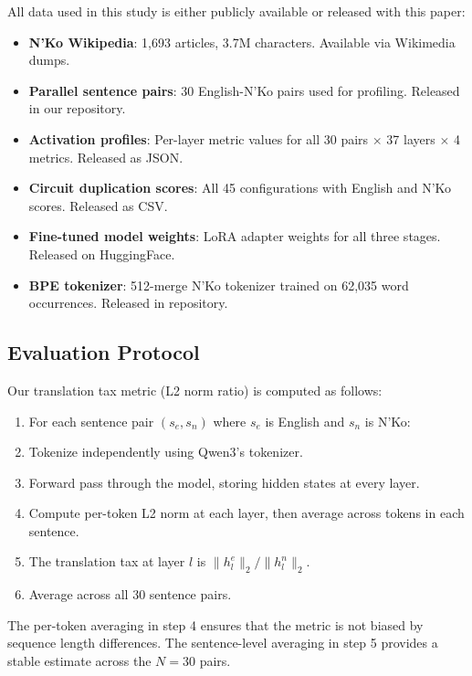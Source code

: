 \documentclass[11pt]{article}
\begin{document}
All data used in this study is either publicly available or released with this paper:
\begin{itemize}
\item \textbf{N'Ko Wikipedia}: 1,693 articles, 3.7M characters. Available via Wikimedia dumps.
\item \textbf{Parallel sentence pairs}: 30 English-N'Ko pairs used for profiling. Released in our repository.
\item \textbf{Activation profiles}: Per-layer metric values for all 30 pairs $\times$ 37 layers $\times$ 4 metrics. Released as JSON.
\item \textbf{Circuit duplication scores}: All 45 configurations with English and N'Ko scores. Released as CSV.
\item \textbf{Fine-tuned model weights}: LoRA adapter weights for all three stages. Released on HuggingFace.
\item \textbf{BPE tokenizer}: 512-merge N'Ko tokenizer trained on 62,035 word occurrences. Released in repository.
\end{itemize}

\subsection{Evaluation Protocol}

Our translation tax metric (L2 norm ratio) is computed as follows:

\begin{enumerate}
\item For each sentence pair $(s_e, s_n)$ where $s_e$ is English and $s_n$ is N'Ko:
\item Tokenize independently using Qwen3's tokenizer.
\item Forward pass through the model, storing hidden states at every layer.
\item Compute per-token L2 norm at each layer, then average across tokens in each sentence.
\item The translation tax at layer $l$ is $\|h_l^e\|_2 / \|h_l^n\|_2$.
\item Average across all 30 sentence pairs.
\end{enumerate}

The per-token averaging in step 4 ensures that the metric is not biased by sequence length differences.
The sentence-level averaging in step 5 provides a stable estimate across the $N=30$ pairs.

\end{document}
